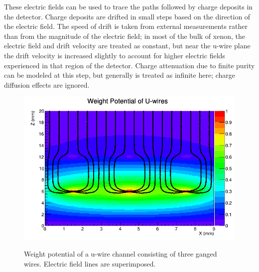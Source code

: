 These electric fields can be used to trace the paths followed by charge deposits in the detector.  Charge deposits are drifted in small steps based on the direction of the electric field.  The speed of drift is taken from external measurements rather than from the magnitude of the electric field; in most of the bulk of xenon, the electric field and drift velocity are treated as constant, but near the u-wire plane the drift velocity is increased slightly to account for higher electric fields experienced in that region of the detector.  Charge attenuation due to finite purity can be modeled at this step, but generally is treated as infinite here; charge diffusion effects are ignored.

\begin{figure}
\begin{center}
\includegraphics[keepaspectratio=true,width=\textwidth]{WeightPotContoursU_WithE.png}
\end{center}
\renewcommand{\baselinestretch}{1}
\small\normalsize
\begin{quote}
\caption{Weight potential of a u-wire channel consisting of three ganged wires.  Electric field lines are superimposed.~\cite{MCDocumentRun2a}}
\label{fig:UWireWeightPotential}
\end{quote}
\end{figure}
\renewcommand{\baselinestretch}{2}
\small\normalsize

